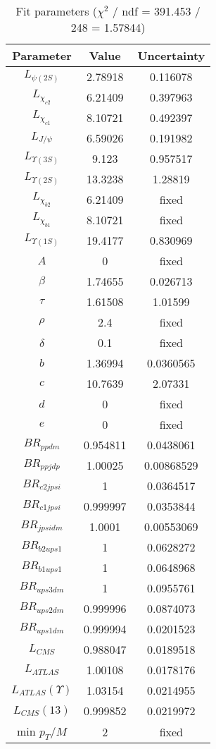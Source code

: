 \begin{table}
\centering
\begin{tabular}{c|c|c}
Parameter & Value & Uncertainty \\
\hline
$L_{\psi(2S)}$ & 2.78918 & 0.116078 \\
$L_{\chi_{c2}}$ & 6.21409 & 0.397963 \\
$L_{\chi_{c1}}$ & 8.10721 & 0.492397 \\
$L_{J/\psi}$ & 6.59026 & 0.191982 \\
$L_{\Upsilon(3S)}$ & 9.123 & 0.957517 \\
$L_{\Upsilon(2S)}$ & 13.3238 & 1.28819 \\
$L_{\chi_{b2}}$ & 6.21409 & fixed \\
$L_{\chi_{b1}}$ & 8.10721 & fixed \\
$L_{\Upsilon(1S)}$ & 19.4177 & 0.830969 \\
$A$ & 0 & fixed \\
$\beta$ & 1.74655 & 0.026713 \\
$\tau$ & 1.61508 & 1.01599 \\
$\rho$ & 2.4 & fixed \\
$\delta$ & 0.1 & fixed \\
$b$ & 1.36994 & 0.0360565 \\
$c$ & 10.7639 & 2.07331 \\
$d$ & 0 & fixed \\
$e$ & 0 & fixed \\
$BR_{ppdm}$ & 0.954811 & 0.0438061 \\
$BR_{ppjdp}$ & 1.00025 & 0.00868529 \\
$BR_{c2jpsi}$ & 1 & 0.0364517 \\
$BR_{c1jpsi}$ & 0.999997 & 0.0353844 \\
$BR_{jpsidm}$ & 1.0001 & 0.00553069 \\
$BR_{b2ups1}$ & 1 & 0.0628272 \\
$BR_{b1ups1}$ & 1 & 0.0648968 \\
$BR_{ups3dm}$ & 1 & 0.0955761 \\
$BR_{ups2dm}$ & 0.999996 & 0.0874073 \\
$BR_{ups1dm}$ & 0.999994 & 0.0201523 \\
$L_{CMS}$ & 0.988047 & 0.0189518 \\
$L_{ATLAS}$ & 1.00108 & 0.0178176 \\
$L_{ATLAS}(\Upsilon)$ & 1.03154 & 0.0214955 \\
$L_{CMS}(13)$ & 0.999852 & 0.0219972 \\
min $p_T/M$ & 2 & fixed \\
\end{tabular}
\caption{Fit parameters ($\chi^2$ / ndf = 391.453 / 248 = 1.57844)}
\end{table}
